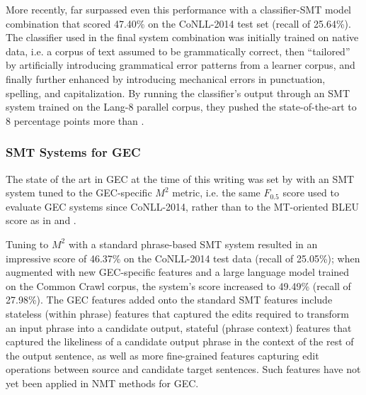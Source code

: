 More recently, \citet{Rozovskaya2016GrammaticalClassifiers} far surpassed even this performance with a classifier-SMT model combination that scored 47.40\% on the CoNLL-2014 test set (recall of 25.64\%). The classifier used in the final system combination was initially trained on native data, i.e. a corpus of text assumed to be grammatically correct, then ``tailored'' by artificially introducing grammatical error patterns from a learner corpus, and finally further enhanced by introducing mechanical errors in punctuation, spelling, and capitalization. By running the classifier's output through an SMT system trained on the Lang-8 parallel corpus, they pushed the state-of-the-art to 8 percentage points more than \citet{Susanto2014SystemCorrection}.

\subsubsection{SMT Systems for GEC}


The state of the art in GEC at the time of this writing was set by \citet{Junczys-Dowmunt2016Phrase-basedCorrection} with an SMT system tuned to the GEC-specific $M^2$ metric, i.e. the same $F_{0.5}$ score used to evaluate GEC systems since CoNLL-2014, rather than to the MT-oriented BLEU score as in \citet{Susanto2014SystemCorrection} and \citet{Rozovskaya2016GrammaticalClassifiers}.

Tuning to $M^2$ with a standard phrase-based SMT system resulted in an impressive score of 46.37\% on the CoNLL-2014 test data (recall of 25.05\%); when augmented with new GEC-specific features and a large language model trained on the Common Crawl corpus, the system's score increased to 49.49\% (recall of 27.98\%). The GEC features added onto the standard SMT features include stateless (within phrase) features that captured the edits required to transform an input phrase into a candidate output, stateful (phrase context) features that captured the likeliness of a candidate output phrase in the context of the rest of the output sentence, as well as more fine-grained features capturing edit operations between source and candidate target sentences. Such features have not yet been applied in NMT methods for GEC.

